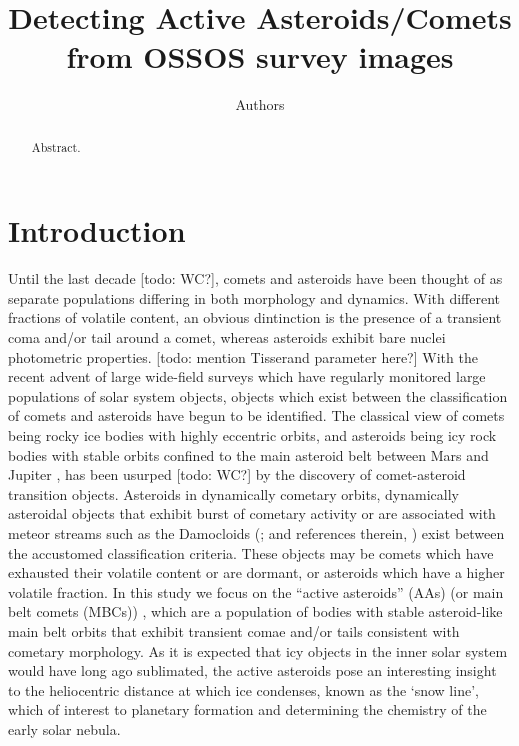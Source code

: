 \documentclass[iop,apj]{emulateapj}
\begin{document}
\title{Detecting Active Asteroids/Comets from OSSOS survey images}
\author{Authors}

\begin{abstract}
Abstract.
\end{abstract}

\maketitle

\section{Introduction}

Until the last decade [todo: WC?], comets and asteroids have been thought of as separate populations differing in  both morphology and dynamics. With different fractions of volatile content, an obvious dintinction is the presence of a transient coma and/or tail around a comet, whereas asteroids exhibit bare nuclei photometric properties. [todo: mention Tisserand parameter here?]  With the recent advent of large wide-field surveys which have regularly monitored large populations of solar system objects, objects which exist between the classification of comets and asteroids have begun to be identified. The classical view of comets being rocky ice bodies with highly eccentric orbits, and asteroids being icy rock bodies with stable orbits confined to the main asteroid belt between Mars and Jupiter \citep{sheppard15}, has been usurped [todo: WC?] by the discovery of comet-asteroid transition objects. Asteroids in dynamically cometary orbits, dynamically asteroidal objects that exhibit burst of cometary activity or are associated with meteor streams such as the Damocloids (\cite{sonnett11}; and references therein, \cite{gilbert09}) exist between the accustomed classification criteria. These objects may be comets which have exhausted their volatile content or are dormant, or asteroids which have a higher volatile fraction. In this study we focus on the ``active asteroids'' (AAs) (or main belt comets (MBCs)) \citep{hsieh06}, which are a population of bodies with stable asteroid-like main belt orbits that exhibit transient comae and/or tails consistent with cometary morphology.  As it is expected that icy objects in the inner solar system would have long ago sublimated, the active asteroids pose an interesting insight to the heliocentric distance at which ice condenses, known as the `snow line', which of interest to planetary formation and determining the chemistry of the early solar nebula.
\end{document}
